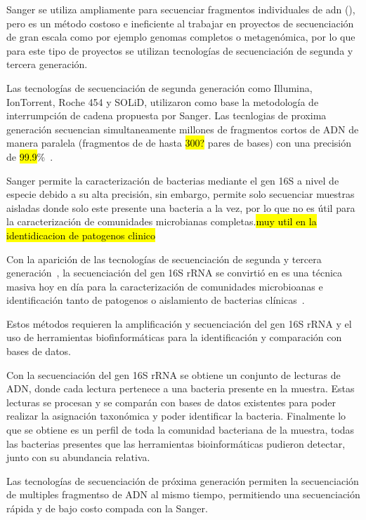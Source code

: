 Sanger se utiliza ampliamente para secuenciar fragmentos individuales de adn (), pero es un método costoso e ineficiente al trabajar en proyectos de secuenciación de gran escala como por ejemplo genomas completos o metagenómica, por lo que para este tipo de proyectos se utilizan tecnologías de secuenciación de segunda y tercera generación.
 
Las tecnologías de secuenciación de segunda generación como Illumina, IonTorrent, Roche 454 y SOLiD,  utilizaron como base la metodología de interrumpción de cadena propuesta por Sanger. Las tecnlogias de proxima generación secuencian simultaneamente millones de fragmentos cortos de ADN de manera paralela (fragmentos de de hasta \hl{300?} pares de bases) con una precisión de \hl{99.9}\%~\cite{}. 

Sanger permite la caracterización de bacterias mediante el gen 16S a nivel de especie debido a su alta precisión, sin embargo, permite solo secuenciar muestras aisladas donde solo este presente una bacteria a la vez, por lo que no es útil para la caracterización de comunidades microbianas completas.\hl{muy util en la identidicacion de patogenos clinico}

Con la aparición de las tecnologías de secuenciación de segunda y tercera generación~\cite{janda200716s,pollock2018madness}, la secuenciación del gen 16S rRNA se convirtió en es una técnica masiva hoy en día para la caracterización de comunidades microbioanas e identificación tanto de patogenos o aislamiento de bacterias clínicas~\cite{patel200116s}.

Estos métodos requieren la amplificación y secuenciación del gen 16S rRNA y el uso de herramientas biofinformáticas para la identificación y comparación con bases de datos.

Con la secuenciación del gen 16S rRNA se obtiene un conjunto de lecturas de ADN, donde cada lectura pertenece a una bacteria presente en la muestra. Estas lecturas se procesan y se comparán con bases de datos existentes para poder realizar la asignación taxonómica y poder identificar la bacteria. Finalmente lo que se obtiene es un perfil de toda la comunidad bacteriana de la muestra, todas las bacterias presentes que las herramientas bioinformáticas pudieron detectar, junto con su abundancia relativa.


Las tecnologías de secuenciación de próxima generación permiten la secuenciación de multiples fragmentso de ADN al mismo tiempo, permitiendo una secuenciación rápida  y de bajo costo compada con la Sanger.

